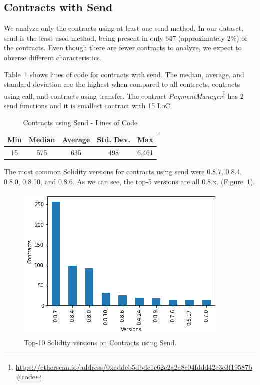 \documentclass[10pt,conference]{IEEEtran}
\begin{document}
\subsection{Contracts with Send}

We analyze only the contracts using at least one send method. In our dataset, send is the least used method, being present in only 647 (approximately 2\%) of the contracts. Even though there are fewer contracts to analyze, we expect to obverse different characteristics.

Table~\ref{tab:send-loc} shows lines of code for contracts with send. The median, average, and standard deviation are the highest when compared to all contracts, contracts using call, and contracts using transfer. 
The contract \textit{PaymentManager}\footnote{\url{https://etherscan.io/address/0xaddeb5dbdc1c62c2a2a8e04fddd42e3c3f19587b\#code}} has 2 send functions and it is smallest contract with 15 LoC.

\begin{table}
\center
  \caption{Contracts using Send - Lines of Code}
  \label{tab:send-loc}
  \begin{tabular}{c c c c c}
    \hline
    Min & Median & Average & Std. Dev. & Max \\
    \hline
   15 & 575 & 635 & 498 & 6,461 \\
  \hline
\end{tabular}
\end{table}

The most common Solidity versions for contracts using send were 0.8.7,  0.8.4,  0.8.0,  0.8.10,  and 0.8.6. As we can see,  the top-5 versions are all 0.8.x. (Figure~\ref{fig:send_version}).

\begin{figure}[h]
  \centering
  \includegraphics[width=\linewidth]{img/sends_clean_final.png}
  \caption{Top-10 Solidity versions on Contracts using Send.}
  \label{fig:send_version}
\end{figure}
\end{document}
